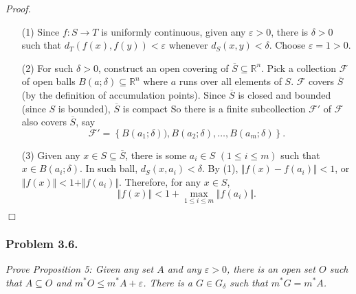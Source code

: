\documentclass{article}
\begin{document}
\emph{Proof.}
\begin{enumerate}
\item[(1)]
  Since $f: S \rightarrow T$ is uniformly continuous,
  given any $\varepsilon > 0$, there is $\delta > 0$ such that
  $d_T(f(x), f(y)) < \varepsilon$ whenever $d_S(x, y) < \delta$.
  Choose $\varepsilon = 1 > 0$.

\item[(2)]
  For such $\delta > 0$, construct an open covering of $\overline{S} \subseteq \mathbb{R}^n$.
  Pick a collection $\mathscr{F}$ of open balls
  $B(a;\delta) \subseteq \mathbb{R}^n$
  where $a$ runs over all elements of $S$.
  $\mathscr{F}$ covers $\overline{S}$ (by the definition of accumulation points).
  Since $\overline{S} $ is closed and bounded (since $S$ is bounded),
  $\overline{S}$ is compact
  So there is a finite subcollection $\mathscr{F}'$ of $\mathscr{F}$
  also covers $\overline{S}$, say
  \[
    \mathscr{F}'
    = \left\{B(a_1;\delta)), B(a_2;\delta), \ldots, B(a_m;\delta) \right\}.
  \]

\item[(3)]
  Given any $x \in S \subseteq \overline{S}$,
  there is some $a_i \in S$ $(1 \leq i \leq m)$ such that $x \in B(a_i;\delta)$.
  In such ball, $d_S(x, a_i) < \delta$.
  By (1), $\Vert f(x) - f(a_i) \Vert < 1$,
  or $\Vert f(x) \Vert < 1 + \Vert f(a_i) \Vert$.
  Therefore, for any $x \in S$,
  \[
    \Vert f(x) \Vert < 1 + \max_{1 \leq i \leq m}{\Vert f(a_i) \Vert}.
  \]
\end{enumerate}
$\Box$ \\






\subsubsection*{Problem 3.6.}
\emph{Prove Proposition 5:
Given any set $A$ and any $\varepsilon > 0$,
there is an open set $O$ such that $A \subseteq O$
and $m^{*}O \leq m^{*}A + \varepsilon$.
There is a $G \in G_{\delta}$ such that $m^{*}G = m^{*}A$.} \\
\end{document}
